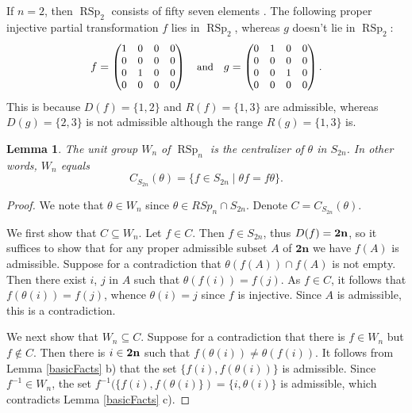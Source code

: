 \documentclass[11pt]{article}
\newtheorem{lemma}[theorem]{Lemma}
\newcommand{\mb}{\mathbf}
\DeclareMathOperator{\RSp}{RSp}
\begin{document}
If $n=2$, then $\RSp_2$ consists of fifty seven elements \cite{ZHL}. The following proper injective partial transformation $f$ lies in $\RSp_2$, whereas $g$ doesn't lie in $\RSp_2$:
%
\[\label{fAndg}
\small{
               f =   \begin{pmatrix}
                        1&0&0&0\\
                        0&0&0&0\\
                        0&1&0&0\\
                        0&0&0&0\\
                    \end{pmatrix}
                    \quad\mbox{and}\quad
                    g =   \begin{pmatrix}
                        0&1&0&0\\
                        0&0&0&0\\
                        0&0&1&0\\
                        0&0&0&0\\
                    \end{pmatrix}.
    }
\]
This is because $D(f)=\{1, 2\}$ and $R(f) = \{1, 3\}$ are admissible, whereas $D(g)=\{2, 3\}$ is not admissible although the range $R(g) = \{1, 3\}$ is.

\begin{lemma}{\label{SymWeylGroup}}
The unit group $W_n$ of $\RSp_n$ is the centralizer of $\theta$ in $S_{2n}$. In other words, $W_n$ equals
\[
    C_{S_{2n}}(\theta) = \{f\in S_{2n} \mid \theta f = f\theta\}.
\] 
\end{lemma}
%
\begin{proof}
We note that  $\theta\in W_n$ since $\theta\in RSp_n\cap S_{2n}$. 
 Denote $C=C_{S_{2n}}(\theta)$. 

We first show that $C\subseteq W_n$. 
Let $f\in C$. Then $f\in S_{2n}$, thus $D(f)=\bf 2n$, so it suffices to show that for any proper admissible subset $A$ of $\mb{2n}$ we have $f(A)$ is admissible. Suppose for a contradiction that $\theta(f(A))\cap f(A)$ is not empty.
Then there exist $i$, $j$ in $A$ such that $\theta (f(i))=f(j)$. As $f\in C$, it follows that $f(\theta (i))=f(j)$, 
whence $\theta(i)=j$ since $f$ is injective. Since $A$ is admissible, this is a contradiction.

We next show that $W_n\subseteq C.$ Suppose for a contradiction that there is $f\in W_n$ but $f\notin C.$ 
Then there is $i\in{\bf 2n}$ such that $f(\theta(i))\ne \theta(f(i)).$ It follows from Lemma \ref{basicFacts} b) that the set $\{f(i), f(\theta(i))\}$ is admissible. Since $f^{-1}\in W_n$, the set $f^{-1}(\{f(i), f(\theta(i)\}) = \{i, \theta(i)\}$ is admissible, which contradicts Lemma \ref{basicFacts} c). 
\end{proof}
\end{document}
